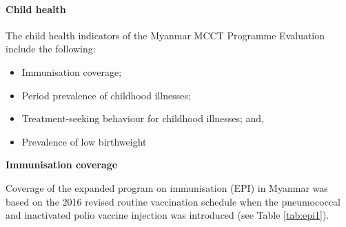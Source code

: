 \documentclass[12pt,a4paper]{article}
\let\oldparagraph\paragraph
\renewcommand{\paragraph}[1]{\oldparagraph{#1}\mbox{}}
\begin{document}
\hypertarget{chealth}{%
\paragraph{Child health}\label{chealth}}

The child health indicators of the Myanmar MCCT Programme Evaluation include the following:

\begin{itemize}
\item
  Immunisation coverage;
\item
  Period prevalence of childhood illnesses;
\item
  Treatment-seeking behaviour for childhood illnesses; and,
\item
  Prevalence of low birthweight
\end{itemize}

\textbf{Immunisation coverage}

Coverage of the expanded program on immunisation (EPI) in Myanmar was based on the 2016 revised routine vaccination schedule when the pneumococcal and inactivated polio vaccine injection was introduced \citep{MoHMyanmar:2016wp} (see Table \ref{tab:epi1}).
\end{document}
